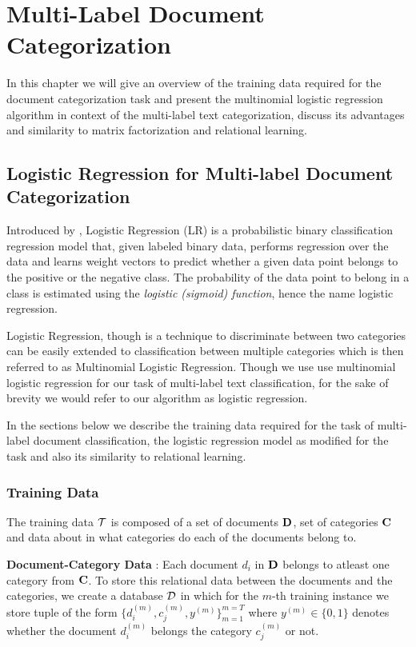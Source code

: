 \chapter{Multi-Label Document Categorization}
\label{chapter:mltextcat}
In this chapter we will give an overview of the training data required for the document categorization task and present the multinomial logistic regression algorithm in context of the multi-label text categorization, discuss its advantages and similarity to matrix factorization and relational learning.

\section{Logistic Regression for Multi-label Document Categorization}
\label{sec:lrtc}
Introduced by \citep{hosmer1989applied}, Logistic Regression (LR) is a probabilistic binary classification regression model that, given labeled binary data, performs regression over the data and learns weight vectors to predict whether a given data point belongs to the positive or the negative class. 
The probability of the data point to belong in a class is estimated using the \emph{logistic (sigmoid) function}, hence the name logistic regression.

Logistic Regression, though is a technique to discriminate between two categories can be easily extended to classification between multiple categories which is then referred to as Multinomial Logistic Regression. 
Though we use use multinomial logistic regression for our task of multi-label text classification, for the sake of brevity we would refer to our algorithm as logistic regression.\

In the sections below we describe the training data required for the task of multi-label document classification, the logistic regression model as modified for the task and also its similarity to relational learning.

\subsection{Training Data}
\label{sec:trdata_lr}
The training data $\mathcal{T}$ is composed of a set of documents $\mathbf{D}$, set of categories $\mathbf{C}$ and data about in what categories do each of the documents belong to. 

\textbf{Document-Category Data} : 
Each document $d_{i}$ in $\mathbf{D}$ belongs to atleast one category from $\mathbf{C}$. To store this relational data between the documents and the categories, we create a database $\mathcal{D}$ in which for the $m$-th training instance we store tuple of the form $\{ d^{(m)}_{i}, c^{(m)}_{j}, y^{(m)}\}^{m=T}_{m=1}$ where $y^{(m)} \in \{0, 1\}$ denotes whether the document $d^{(m)}_{i}$ belongs the category $c^{(m)}_{j}$ or not. 

